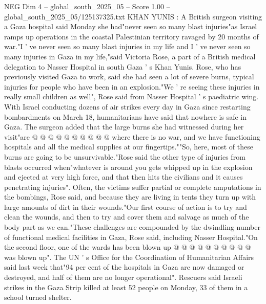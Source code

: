 \begin{textsample}{NEG Dim 4 – global\_south\_2025\_05 – Score 1.00 – global\_south\_2025\_05/125137325.txt}  \label{ex:f4_neg_370}
KHAN YUNIS : A British surgeon visiting a Gaza hospital said Monday she had"never seen so many blast injuries"as Israel ramps up operations in the coastal Palestinian territory ravaged by 20 months of war."I ' ve never seen so many blast injuries in my life and I ' ve never seen so many injuries in Gaza in my life,"said Victoria Rose, a part of a British medical delegation to Nasser Hospital in south Gaza ' s Khan Yunis.
Rose, who has previously visited Gaza to work, said she had seen a lot of severe burns, typical injuries for people who have been in an explosion."We ' re seeing these injuries in really small children as well", Rose said from Nasser Hospital ' s paediatric wing.
With Israel conducting dozens of air strikes every day in Gaza since restarting bombardments on March 18, humanitarians have said that nowhere is safe in Gaza.
The surgeon added that the large burns she had witnessed during her visit"are @ @ @ @ @ @ @ @ @ @ where there is no war, and we have functioning hospitals and all the medical supplies at our fingertips.""So, here, most of these burns are going to be unsurvivable."Rose said the other type of injuries from blasts occurred when"whatever is around you gets whipped up in the explosion and ejected at very high force, and that then hits the civilians and it causes penetrating injuries".
Often, the victims suffer partial or complete amputations in the bombings, Rose said, and because they are living in tents they turn up with large amounts of dirt in their wounds."Our first course of action is to try and clean the wounds, and then to try and cover them and salvage as much of the body part as we can."These challenges are compounded by the dwindling number of functional medical facilities in Gaza, Rose said, including Nasser Hospital."On the second floor, one of the wards has been blown up @ @ @ @ @ @ @ @ @ @ was blown up".
The UN ' s Office for the Coordination of Humanitarian Affairs said last week that"94 per cent of the hospitals in Gaza are now damaged or destroyed, and half of them are no longer operational".
Rescuers said Israeli strikes in the Gaza Strip killed at least 52 people on Monday, 33 of them in a school turned shelter.

\end{textsample}
